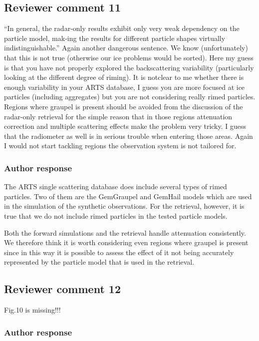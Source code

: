 \documentclass[11pt]{scrartcl}
\begin{document}
\subsection*{Reviewer comment 11}
“In general, the radar-only results exhibit only very weak dependency on the
particle model, mak-ing the results for different particle shapes virtually
indistinguishable.” Again another dangerous sentence. We know (unfortunately)
that this is not true (otherwise our ice problems would be sorted). Here my guess
is that you have not properly explored the backscattering variability
(particularly looking at the different degree of riming). It is notclear to me
whether there is enough variability in your ARTS database, I guess you are more
focused at ice particles (including aggregates) but you are not considering
really rimed particles. Regions where graupel is present should be avoided from
the discussion of the radar-only retrieval for the simple reason that in those
regions attenuation correction and multiple scattering effects make the problem
very tricky. I guess that the radiometer as well is in serious trouble when
entering those areas. Again I would not start tackling regions the observation
system is not tailored for.

\subsubsection*{Author response}

The ARTS single scattering database does include several types of rimed
particles. Two of them are the GemGraupel and GemHail models which are used in
the simulation of the synthetic observations. For the retrieval, however, it is
true that we do not include rimed particles in the tested particle models.

Both the forward simulations and the retrieval handle attenuation consistently.
We therefore think it is worth considering even regions where graupel is present
since in this way it is possible to assess the effect of it not being accurately
represented by the particle model that is used in the retrieval.


\subsection*{Reviewer comment 12}

Fig.10 is missing!!!

\subsubsection*{Author response}
\end{document}
